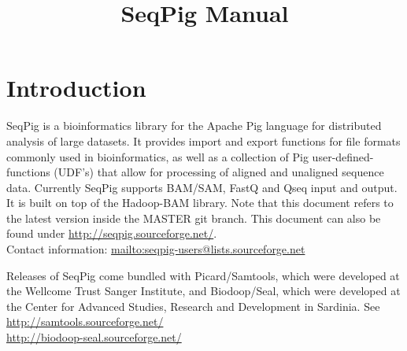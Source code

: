 \documentclass[a4paper,10pt,bibtotoc,abstracton,oneside,noindent,DIV15]{scrartcl}
\title{SeqPig Manual}
\begin{document}
\maketitle

\tableofcontents

\section{Introduction}

SeqPig is a bioinformatics library for the Apache Pig language for
distributed analysis of large datasets. It provides import and export
functions for file formats commonly used in bioinformatics, as well as a
collection of Pig user-defined-functions (UDF's) that allow for processing
of aligned and unaligned sequence data. Currently SeqPig supports BAM/SAM,
FastQ and Qseq input and output. It is built on top of the Hadoop-BAM
library. Note that this document refers to the latest version inside the
MASTER git branch.
This document can also be found under \url{http://seqpig.sourceforge.net/}.\\
Contact information: \url{mailto:seqpig-users@lists.sourceforge.net}

\noindent Releases of SeqPig come bundled with Picard/Samtools, which were
developed at the Wellcome Trust Sanger Institute, and Biodoop/Seal, which
were developed
at the Center for Advanced Studies, Research and Development in Sardinia. See\\
\url{http://samtools.sourceforge.net/}\\
\url{http://biodoop-seal.sourceforge.net/}



\end{document}
